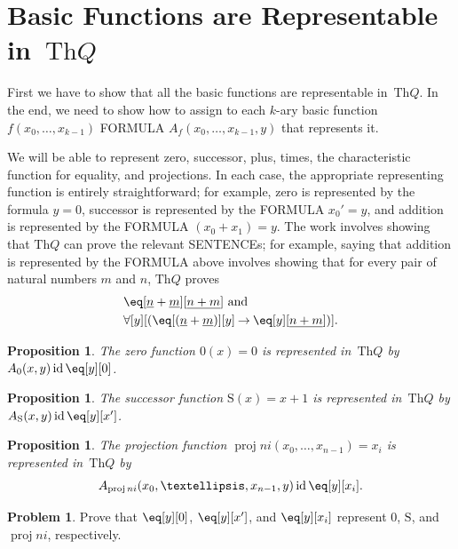 \documentclass[10pt,a4paper]{article}
\newcommand*{\olup}[1]{\MakeUppercase{#1}}
\theoremstyle{plain}
\newtheorem{prop}[thm]{Proposition}
\theoremstyle{definition}
\newtheorem{prob}{Problem}[section]
\theoremstyle{remark}
\newcommand*{\olfileid}[3]{}
\newcommand*{\olsection}[1]{\section*{#1}}
\newcommand*{\ollabel}[1]{\label{#1}}
\providecommand{\lif}{\mathbin{\rightarrow}}
\providecommand{\lforall}{\mathord{\forall}}
\providecommand{\Obj}{}
\providecommand{\Th}{\ensuremath{\mathrm{Th}}}
\providecommand{\num}[1]{\underline{#1}}
\providecommand{\Zero}{\ensuremath{0}}
\providecommand{\Succ}{\ensuremath{\mathrm{S}}}
\providecommand{\Proj}{\operatorname{proj}}
\providecommand{\ident}{\operatorname{id}}
\begin{document}



\olfileid{inc}{req}{bre}
\olsection{Basic Functions are Representable in~$\Th{Q}$}

First we have to show that all the basic functions are representable
in~$\Th{Q}$. In the end, we need to show how to assign to each $k$-ary
basic function $f(x_0,\dots,x_{k-1})$ \olup{formula}
$A_f(x_0,\dots,x_{k-1},y)$ that represents it.

We will be able to represent zero, successor, plus, times, the
characteristic function for equality, and projections. In each case,
the appropriate representing function is entirely straightforward; for
example, zero is represented by the formula $y = \Obj 0$, successor is
represented by the \olup{formula} $x_0' = y$, and addition is represented
by the \olup{formula} $(x_0 + x_1) = y$. The work involves showing that
$\Th{Q}$ can prove the relevant \olup{sentence}s; for example, saying
that addition is represented by the \olup{formula} above involves showing
that for every pair of natural numbers $m$ and $n$, $\Th{Q}$ proves
\begin{align*}
& \eq[\num n + \num m][\num {n+m}] \text{ and}\\
& \lforall[y][(\eq[(\num n + \num m)][y] \lif \eq[y][\num{n+m}])].
\end{align*}

\begin{prop}
\ollabel{prop:rep-zero}
The zero function $\Zero(x) = 0$ is represented in~$\Th{Q}$ by
$A_{\Zero}(x,y) \ident \eq[y][\Obj 0]$.
\end{prop}

\begin{prop}
\ollabel{prop:rep-succ}
The successor function $\Succ(x) = x+1$ is represented in~$\Th{Q}$ by
$A_{\Succ}(x,y) \ident \eq[y][x']$.  
\end{prop}

\begin{prop}
\ollabel{prop:rep-proj}
The projection function $\Proj{n}{i}(x_0, \dots, x_{n-1}) = x_i$ is
represented in~$\Th{Q}$ by \[A_{\Proj{n}{i}}(x_0, \dots, x_{n-1}, y) \ident \eq[y][x_i].\]
\end{prop}

\begin{prob}
Prove that $\eq[y][\Obj 0]$, $\eq[y][x']$, and $\eq[y][x_i]$ represent
$\Zero$, $\Succ$, and $\Proj{n}{i}$, respectively.
\end{prob}
\end{document}
